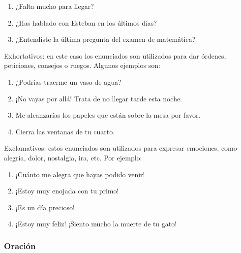 \begin{lista}
\begin{ejems}{}
\begin{enumerate}
\item ¿Falta mucho para llegar? 

\item ¿Has hablado con Esteban en los últimos días?

\item ¿Entendiste la última pregunta del examen de matemática? \end{enumerate}\end{ejems}

\item Exhortativos: en este caso los enunciados son utilizados para
dar órdenes, peticiones, consejos o ruegos. Algunos ejemplos son:
\medskip{}
\begin{ejems}{}\begin{enumerate} 

\item ¿Podrías traerme un vaso de agua?

\item ¡No vayas por allá! Trata de no llegar tarde esta noche. 

\item Me alcanzarías los papeles que están sobre la mesa por favor. 

\item Cierra las ventanas de tu cuarto.\end{enumerate}\end{ejems} 

\item Exclamativos: estos enunciados son utilizados para expresar
emociones, como alegría, dolor, nostalgia, ira, etc. Por ejemplo:
\medskip{}
\begin{ejems}{}\begin{enumerate} 

\item ¡Cuánto me alegra que hayas podido venir! 

\item ¡Estoy muy enojada con tu primo! 

\item ¡Es un día precioso!

\item ¡Estoy muy feliz! ¡Siento mucho la muerte de tu gato! \end{enumerate}\end{ejems}

\end{lista}


\subsubsection{Oración}

